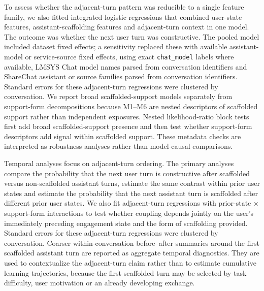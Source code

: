 To assess whether the adjacent-turn pattern was reducible to a single feature family, we also fitted integrated logistic regressions that combined user-state features, assistant-scaffolding features and adjacent-turn context in one model. The outcome was whether the next user turn was constructive. The pooled model included dataset fixed effects; a sensitivity replaced these with available assistant-model or service-source fixed effects, using exact \texttt{chat\_model} labels where available, LMSYS Chat model names parsed from conversation identifiers and ShareChat assistant or source families parsed from conversation identifiers. Standard errors for these adjacent-turn regressions were clustered by conversation. We report broad scaffolded-support models separately from support-form decompositions because M1--M6 are nested descriptors of scaffolded support rather than independent exposures. Nested likelihood-ratio block tests first add broad scaffolded-support presence and then test whether support-form descriptors add signal within scaffolded support. These metadata checks are interpreted as robustness analyses rather than model-causal comparisons.

Temporal analyses focus on adjacent-turn ordering. The primary analyses compare the probability that the next user turn is constructive after scaffolded versus non-scaffolded assistant turns, estimate the same contrast within prior user states and estimate the probability that the next assistant turn is scaffolded after different prior user states. We also fit adjacent-turn regressions with prior-state $\times$ support-form interactions to test whether coupling depends jointly on the user's immediately preceding engagement state and the form of scaffolding provided. Standard errors for these adjacent-turn regressions were clustered by conversation. Coarser within-conversation before--after summaries around the first scaffolded assistant turn are reported as aggregate temporal diagnostics. They are used to contextualize the adjacent-turn claim rather than to estimate cumulative learning trajectories, because the first scaffolded turn may be selected by task difficulty, user motivation or an already developing exchange.





